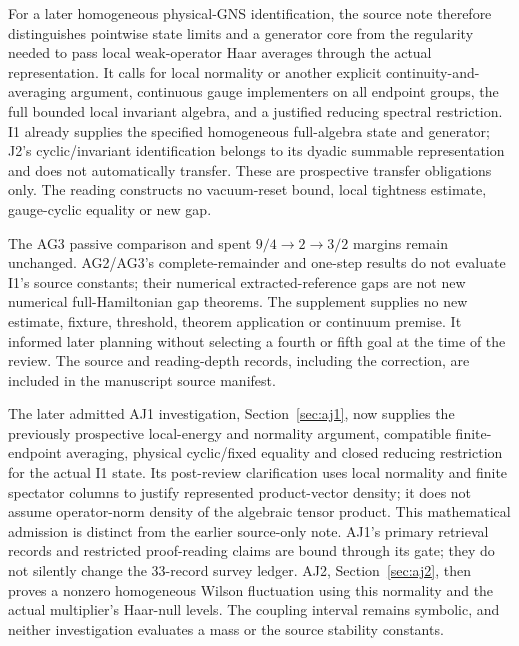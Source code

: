 For a later homogeneous physical-GNS identification, the source note therefore distinguishes pointwise state limits and a generator core from the regularity needed to pass local weak-operator Haar averages through the actual representation. It calls for local normality or another explicit continuity-and-averaging argument, continuous gauge implementers on all endpoint groups, the full bounded local invariant algebra, and a justified reducing spectral restriction. I1 already supplies the specified homogeneous full-algebra state and generator; J2's cyclic/invariant identification belongs to its dyadic summable representation and does not automatically transfer. These are prospective transfer obligations only. The reading constructs no vacuum-reset bound, local tightness estimate, gauge-cyclic equality or new gap.

The AG3 passive comparison and spent $9/4\to2\to3/2$ margins remain unchanged. AG2/AG3's complete-remainder and one-step results do not evaluate I1's source constants; their numerical extracted-reference gaps are not new numerical full-Hamiltonian gap theorems. The supplement supplies no new estimate, fixture, threshold, theorem application or continuum premise. It informed later planning without selecting a fourth or fifth goal at the time of the review. The source and reading-depth records, including the correction, are included in the manuscript source manifest.

The later admitted AJ1 investigation, Section~\ref{sec:aj1}, now supplies the previously prospective local-energy and normality argument, compatible finite-endpoint averaging, physical cyclic/fixed equality and closed reducing restriction for the actual I1 state. Its post-review clarification uses local normality and finite spectator columns to justify represented product-vector density; it does not assume operator-norm density of the algebraic tensor product. This mathematical admission is distinct from the earlier source-only note. AJ1's primary retrieval records and restricted proof-reading claims are bound through its gate; they do not silently change the 33-record survey ledger. AJ2, Section~\ref{sec:aj2}, then proves a nonzero homogeneous Wilson fluctuation using this normality and the actual multiplier's Haar-null levels. The coupling interval remains symbolic, and neither investigation evaluates a mass or the source stability constants.
